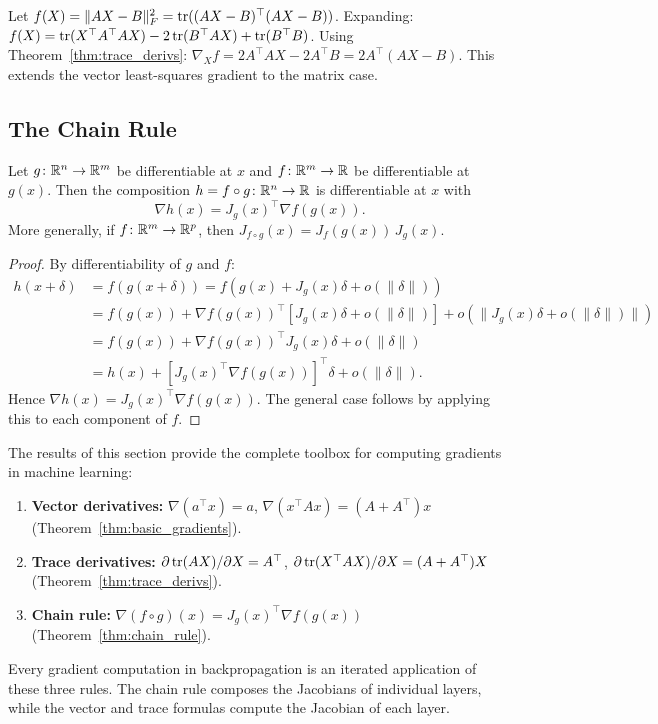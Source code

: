 \documentclass[11pt,a4paper]{article}
\begin{document}
\begin{example}[Gradient of $\|AX - B\|_F^2$]
\label{ex:matrix_ls}
Let $f(X) = \|AX - B\|_F^2 = \operatorname{tr}((AX - B)^\top(AX - B))$.  Expanding:
$f(X) = \operatorname{tr}(X^\top A^\top A X) - 2\operatorname{tr}(B^\top AX) + \operatorname{tr}(B^\top B)$.
Using Theorem~\ref{thm:trace_derivs}:
$\nabla_X f = 2A^\top A X - 2A^\top B = 2A^\top(AX - B)$.
This extends the vector least-squares gradient to the matrix case.
\end{example}

\subsection{The Chain Rule}

\begin{theorem}
\label{thm:chain_rule}
Let $g\colon \mathbb{R}^n \to \mathbb{R}^m$ be differentiable at $x$ and
$f\colon \mathbb{R}^m \to \mathbb{R}$ be differentiable at $g(x)$.  Then the
composition $h = f \circ g\colon \mathbb{R}^n \to \mathbb{R}$ is differentiable at $x$
with
\[
  \nabla h(x) = J_g(x)^\top \nabla f(g(x)).
\]
More generally, if $f\colon \mathbb{R}^m \to \mathbb{R}^p$, then $J_{f \circ g}(x) = J_f(g(x))\, J_g(x)$.
\end{theorem}

\begin{proof}
By differentiability of $g$ and $f$:
\begin{align*}
  h(x + \delta) &= f(g(x + \delta))
  = f(g(x) + J_g(x)\delta + o(\|\delta\|)) \\
  &= f(g(x)) + \nabla f(g(x))^\top [J_g(x)\delta + o(\|\delta\|)]
     + o(\|J_g(x)\delta + o(\|\delta\|)\|) \\
  &= f(g(x)) + \nabla f(g(x))^\top J_g(x)\delta + o(\|\delta\|) \\
  &= h(x) + [J_g(x)^\top \nabla f(g(x))]^\top \delta + o(\|\delta\|).
\end{align*}
Hence $\nabla h(x) = J_g(x)^\top \nabla f(g(x))$.  The general case
follows by applying this to each component of $f$.
\end{proof}

\begin{keyresult}[title={Matrix Calculus Toolbox for Gradient Computation}]
The results of this section provide the complete toolbox for computing
gradients in machine learning:
\begin{enumerate}[nosep]
  \item \textbf{Vector derivatives:} $\nabla(a^\top x) = a$,
        $\nabla(x^\top Ax) = (A + A^\top)x$ (Theorem~\ref{thm:basic_gradients}).
  \item \textbf{Trace derivatives:} $\partial \operatorname{tr}(AX)/\partial X = A^\top$,
        $\partial \operatorname{tr}(X^\top AX)/\partial X = (A + A^\top)X$
        (Theorem~\ref{thm:trace_derivs}).
  \item \textbf{Chain rule:} $\nabla(f \circ g)(x)
        = J_g(x)^\top \nabla f(g(x))$ (Theorem~\ref{thm:chain_rule}).
\end{enumerate}
Every gradient computation in backpropagation is an iterated application
of these three rules.  The chain rule composes the Jacobians of
individual layers, while the vector and trace formulas compute the
Jacobian of each layer.
\end{keyresult}
\end{document}
